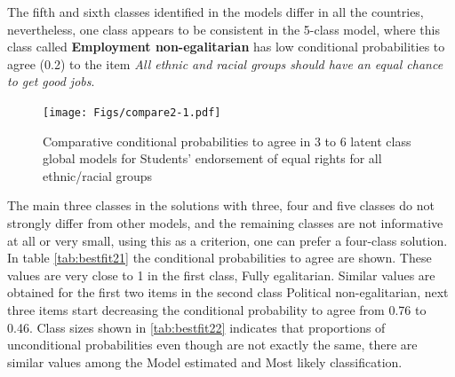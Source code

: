 \documentclass[12pt,a4paper,oneside]{reedthesis}
\begin{document}
The fifth and sixth classes identified in the models differ in all the countries, nevertheless, one class appears to be consistent in the 5-class model, where this class called \textbf{Employment non-egalitarian} has low conditional probabilities to agree (0.2) to the item \emph{All ethnic and racial groups should have an equal chance to get good jobs}.
\begin{figure}
\centering
\texttt{[image: Figs/compare2-1.pdf]}
\caption{\label{fig:compare2}Comparative conditional probabilities to agree in 3 to 6 latent class global models for Students' endorsement of equal rights for all ethnic/racial groups}
\end{figure}
The main three classes in the solutions with three, four and five classes do not strongly differ from other models, and the remaining classes are not informative at all or very small, using this as a criterion, one can prefer a four-class solution. In table \ref{tab:bestfit21} the conditional probabilities to agree are shown. These values are very close to 1 in the first class, Fully egalitarian. Similar values are obtained for the first two items in the second class Political non-egalitarian, next three items start decreasing the conditional probability to agree from 0.76 to 0.46. Class sizes shown in \ref{tab:bestfit22} indicates that proportions of unconditional probabilities even though are not exactly the same, there are similar values among the Model estimated and Most likely classification.

\newpage
\end{document}
